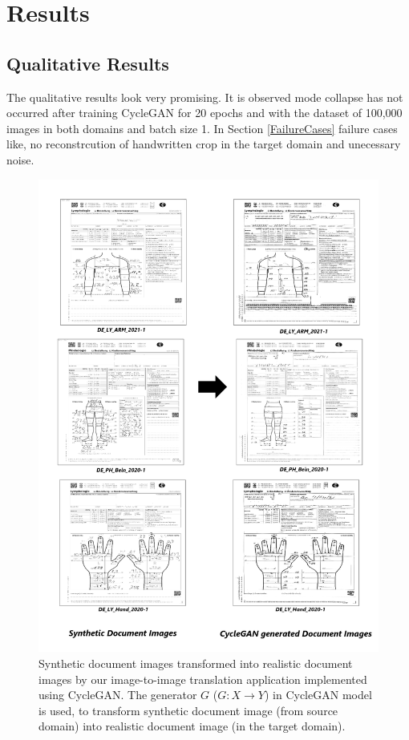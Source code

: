 \section{Results}\label{results}


\subsection{Qualitative Results}

The qualitative results look very promising. It is observed mode collapse has not occurred after training \ac{CycleGAN} for 20 epochs and with the dataset of 100,000 images in both domains and batch size 1. In Section \ref{FailureCases} failure cases like, no reconstrcution of handwritten crop in the target domain and unecessary noise.

\begin{figure}[H]
        \begin{center}
	    \includegraphics[scale=0.30]{images/Evaluation/Qualitative_Results.png}
	    \caption[Synthetic document images transformed into realistic document images by our image-to-image translation application implemented using \ac{CycleGAN}.]{Synthetic document images transformed into realistic document images by our image-to-image translation application implemented using \ac{CycleGAN}. The generator $G$ ($G: X \rightarrow Y$) in \ac{CycleGAN} model is used, to transform synthetic document image (from source domain) into realistic document image (in the target domain).}
	    \label{fig:QualitativeResults}
	    \end{center}
\end{figure}


